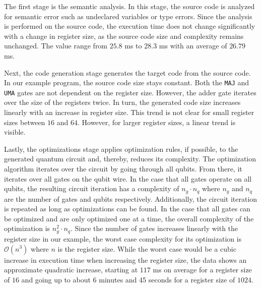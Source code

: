The first stage is the semantic analysis. In this stage, the source code is analyzed for semantic error such as undeclared variables or type errors. Since the analysis is performed on the source code, the execution time does not change significantly with a change in register size, as the source code size and complexity remains unchanged. The value range from $25.8$ ms to $28.3$ ms with an average of $26.79$ ms. 

Next, the code generation stage generates the target code from the source code. In our example program, the source code size stays constant. Both the \texttt{MAJ} and \texttt{UMA} gates are not dependent on the register size. However, the adder gate iterates over the size of the registers twice. In turn, the generated code size increases linearly with an increase in register size. This trend is not clear for small register sizes between $16$ and $64$. However, for larger register sizes, a linear trend is visible.

Lastly, the optimizations stage applies optimization rules, if possible, to the generated quantum circuit and, thereby, reduces its complexity. The optimization algorithm iterates over the circuit by going through all qubits. From there, it iterates over all gates on the qubit wire. In the case that all gates operate on all qubits, the resulting circuit iteration has a complexity of $n_g \cdot n_q$ where $n_g$ and $n_q$ are the number of gates and qubits respectively. Additionally, the circuit iteration is repeated as long as optimizations can be found. In the case that all gates can be optimized and are only optimized one at a time, the overall complexity of the optimization is $n_g^2 \cdot n_q$. Since the number of gates increases linearly with the register size in our example, the worst case complexity for its optimization is $\mathcal{O}(n^3)$ where $n$ is the register size. While the worst case would be a cubic increase in execution time when increasing the register size, the data shows an approximate quadratic increase, starting at $117$ ms on average for a register size of $16$ and going up to about $6$ minutes and 45 seconds for a register size of $1024$. 

